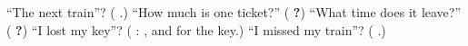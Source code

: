 \begin{tcolorbox}[breakable,colback=teal!4,colframe=teal!35!black,title={Before you move on}]
\textquotedblleft{}The next train\textquotedblright{}? (\textbf{ }.) \textquotedblleft{}How much is one ticket?\textquotedblright{} (\textbf{    ?}) \textquotedblleft{}What time does it leave?\textquotedblright{} (\textbf{  ?}) \textquotedblleft{}I lost my key\textquotedblright{}? (\textbf{    }: \textbf{}, and \textbf{} for the key.) \textquotedblleft{}I missed my train\textquotedblright{}? (\textbf{   }.)
\end{tcolorbox}
